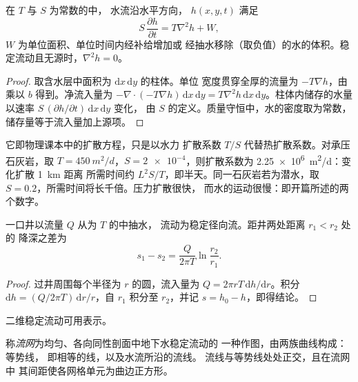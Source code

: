 \begin{theorem}[地下水流方程]\label{thm:b3:hydrogeology:flow-equation}
在 $T$ 与 $S$ 为常数的中，
水流沿水平方向， $h(x, y, t)$ 满足
\[
S\,\frac{\partial h}{\partial t} = T\nabla^2h + W ,
\]
$W$ 为单位面积、单位时间内经补给增加或
经抽水移除（取负值）的水的体积。稳定流动且无源时，$\nabla^2h =
0$。
\end{theorem}

\begin{proof}
取含水层中面积为 $\mathrm dx\,\mathrm dy$ 的柱体。单位
宽度贯穿全厚的流量为 $-T\nabla h$，由乘以
$b$ 得到。净流入量为 $-\nabla\cdot(-T\nabla h)\,\mathrm dx\,\mathrm
dy = T\nabla^2h\,\mathrm dx\,\mathrm dy$。柱体内储存的水量
以速率 $S\,(\partial h/\partial t)\,\mathrm dx\,\mathrm dy$ 变化，
由 $S$ 的定义。质量守恒中，水的密度取为常数，
储存量等于流入量加上源项。
\end{proof}

它即物理课本中的扩散方程，只是以水力
扩散系数 $T/S$ 代替热扩散系数。对承压石灰岩，取
$T = \qty{450}{m^2/d}$，$S = \num{2e-4}$，则扩散系数为
\qty{2.25e6}{m^2/d}：变化扩散 \qty{1}{km} 距离
所需时间约 $L^2S/T$，即半天。同一石灰岩若为潜水，取 $S =
0.2$，所需时间将长千倍。压力扩散很快，
而水的运动很慢：即开篇所述的两个数字。

\begin{proposition}[向井的稳定径向流]\label{prop:b3:hydrogeology:thiem}
一口井以流量 $Q$ 从为 $T$ 的中抽水，
流动为稳定径向流。距井两处距离 $r_1 < r_2$ 处的
降深之差为
\[
s_1 - s_2 = \frac{Q}{2\pi T}\ln\frac{r_2}{r_1} .
\]
\end{proposition}

\begin{proof}
过井周围每个半径为 $r$ 的圆，流入量为 $Q = 2\pi r
T\,\mathrm dh/\mathrm dr$。积分 $\mathrm dh = (Q/2\pi T)\,\mathrm
dr/r$，自 $r_1$ 积分至 $r_2$，并记 $s = h_0 - h$，即得结论。
\end{proof}

二维稳定流动可用表示。

\begin{definition}[流网]\label{def:b3:hydrogeology:flow-net}
称\emph{流网}为均匀、各向同性剖面中地下水稳定流动的
一种作图，由两族曲线构成：等势线，
即相等的线，以及水流所沿的流线。
流线与等势线处处正交，且在流网中
其间距使各网格单元为曲边正方形。
\end{definition}

